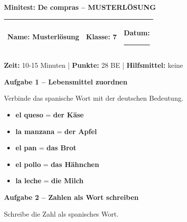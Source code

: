 \documentclass[11pt, a4paper]{article}
\newcommand{\fachfarbe}{spanisch}
\newcommand{\thema}{Minitest: De compras -- MUSTERLÖSUNG}
\newcommand{\klasse}{7}
\newcommand{\maxpunkte}{28}
\newcommand{\zeit}{10-15 Minuten}
\newcommand{\punktebox}[1]{\hfill\fbox{\small \_/#1}}
\newcommand{\luecke}[1]{\rule{#1}{0.4pt}}
\newcommand{\lsg}[1]{\textcolor{loesung}{\textbf{#1}}}
\newenvironment{aufgabe}[1]{%
    \needspace{5\baselineskip}%
    \nopagebreak[4]%
    \vspace{10pt}
    \noindent\textbf{\textcolor{\fachfarbe}{Aufgabe #1}}
    \nopagebreak[4]%
    \vspace{5pt}
    \nopagebreak[4]%
    \begin{list}{}{\leftmargin=0pt}
    \item[]
}{%
    \end{list}
}
\newcommand{\es}[1]{\textcolor{\fachfarbe}{\textbf{#1}}}
\begin{document}

\begin{center}
    {\Large\bfseries\textcolor{loesung}{\thema}}
\end{center}

\vspace{5pt}

\noindent
\begin{tabularx}{\textwidth}{|X|X|X|}
\hline
\textbf{Name:} \lsg{Musterlösung} &
\textbf{Klasse:} \klasse &
\textbf{Datum:} \luecke{2cm} \\
\hline
\end{tabularx}

\vspace{10pt}

\begin{infobox}
\textbf{Zeit:} \zeit{} | \textbf{Punkte:} \maxpunkte{} BE | \textbf{Hilfsmittel:} keine
\end{infobox}

\vspace{15pt}


\begin{aufgabe}{1 -- Lebensmittel zuordnen}
Verbinde das spanische Wort mit der deutschen Bedeutung. \punktebox{5}
\end{aufgabe}

\begin{itemize}[nosep]
    \item \es{el queso} = \lsg{der Käse}
    \item \es{la manzana} = \lsg{der Apfel}
    \item \es{el pan} = \lsg{das Brot}
    \item \es{el pollo} = \lsg{das Hähnchen}
    \item \es{la leche} = \lsg{die Milch}
\end{itemize}

\vspace{15pt}


\begin{aufgabe}{2 -- Zahlen als Wort schreiben}
Schreibe die Zahl als spanisches Wort. \punktebox{5}
\end{aufgabe}
\end{document}
